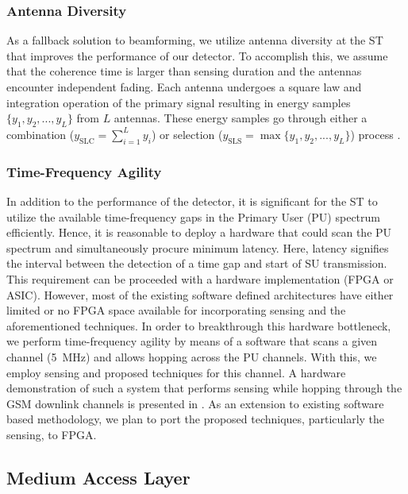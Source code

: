 \documentclass[conference, twocolumn]{IEEEtran}
\newcommand{\sub}[1]{_{\text{#1}}}
\DeclareMathOperator*{\maxi}{max}
\begin{document}
\subsubsection{Antenna Diversity}
As a fallback solution to beamforming, we utilize antenna diversity at the ST that improves the performance of our detector. To accomplish this, we assume that the coherence time is larger than sensing duration and the antennas encounter independent fading. Each antenna undergoes a square law and integration operation of the primary signal resulting in energy samples $\{y_1, y_2,..., y_L\}$ from $L$ antennas. These energy samples go through either a combination ($y\sub{SLC} = \sum_{i=1}^L y_i$) or selection ($y\sub{SLS} = \maxi \{y_1, y_2,...,y_L \}$) process \cite{dig07}. 


\subsubsection{Time-Frequency Agility}
In addition to the performance of the detector, it is significant for the ST to utilize the available time-frequency gaps in the Primary User (PU) spectrum efficiently. Hence, it is reasonable to deploy a hardware that could scan the PU spectrum and simultaneously procure minimum latency. Here, latency signifies the interval between the detection of a time gap and start of SU transmission. This requirement can be proceeded with a hardware implementation (FPGA or ASIC). 
However, most of the existing software defined architectures have either limited or no FPGA space available for incorporating sensing and the aforementioned techniques. In order to breakthrough this hardware bottleneck, we perform time-frequency agility by means of a software that scans a given channel (\SI{5}{MHz}) and allows hopping across the PU channels. With this, we employ sensing and proposed techniques for this channel. 
A hardware demonstration of such a system that performs sensing while hopping through the GSM downlink channels is presented in \cite{Kaushik13}. 
As an extension to existing software based methodology, we plan to port the proposed techniques, particularly the sensing, to FPGA.   


\subsection{Medium Access Layer}
\end{document}
